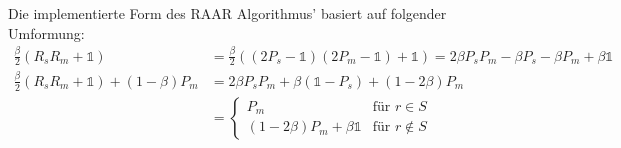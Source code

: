 	Die implementierte Form des RAAR Algorithmus' basiert auf folgender Umformung:
	\begin{align*}
	\frac{\beta}{2}\left(R_sR_m+\mathbb{1}\right)
	&=\frac{\beta}{2}\left((2P_s-\mathbb{1})(2P_m-\mathbb{1})+\mathbb{1}\right)
		=2\beta P_sP_m-\beta P_s-\beta P_m+\beta\mathbb{1}\\
		\frac{\beta}{2}\left(R_sR_m+\mathbb{1}\right)+\left(1-\beta\right) P_m
		&=2\beta P_sP_m+\beta (\mathbb{1}-P_s)+ (1-2\beta)P_m\\
		&=
		\begin{cases}
			P_m &\text{für } r\in S\\
			(1-2\beta)P_m+\beta\mathbb{1}  &\text{für } r\notin S
		\end{cases}\\
	\end{align*}
